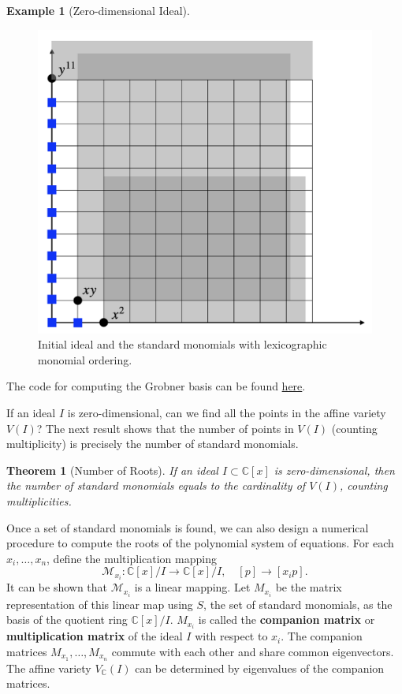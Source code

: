 \documentclass[
]{book}
\newtheorem{theorem}{Theorem}[chapter]
\theoremstyle{definition}
\theoremstyle{definition}
\newtheorem{example}{Example}[chapter]
\theoremstyle{definition}
\theoremstyle{definition}
\theoremstyle{remark}
\begin{document}
\begin{example}[Zero-dimensional Ideal]
\begin{figure}

{\centering \includegraphics[width=0.6\linewidth]{images/zero_dimensional_2} 

}

\caption{Initial ideal and the standard monomials with lexicographic monomial ordering.}\label{fig:ZeroDimensional2}
\end{figure}

The code for computing the Grobner basis can be found \href{https://github.com/ComputationalRobotics/Semidefinite-Examples/blob/main/zero_d_ideal.m}{here}.
\end{example}

If an ideal \(I\) is zero-dimensional, can we find all the points in the affine variety \(V(I)\)? The next result shows that the number of points in \(V(I)\) (counting multiplicity) is precisely the number of standard monomials.

\begin{theorem}[Number of Roots]
\protect\hypertarget{thm:PolySysRoots}{}\label{thm:PolySysRoots}If an ideal \(I \subset \mathbb{C}[x]\) is zero-dimensional, then the number of standard monomials equals to the cardinality of \(V(I)\), counting multiplicities.
\end{theorem}

Once a set of standard monomials is found, we can also design a numerical procedure to compute the roots of the polynomial system of equations. For each \(x_i,\dots,x_n\), define the multiplication mapping
\[
\mathcal{M}_{x_i}: \mathbb{C}[x]/I \rightarrow \mathbb{C}[x]/I, \quad [p] \rightarrow [x_i p].
\]
It can be shown that \(\mathcal{M}_{x_i}\) is a linear mapping. Let \(M_{x_i}\) be the matrix representation of this linear map using \(S\), the set of standard monomials, as the basis of the quotient ring \(\mathbb{C}[x]/I\). \(M_{x_i}\) is called the \textbf{companion matrix} or \textbf{multiplication matrix} of the ideal \(I\) with respect to \(x_i\). The companion matrices \(M_{x_1},\dots,M_{x_n}\) commute with each other and share common eigenvectors. The affine variety \(V_{\mathbb{C}}(I)\) can be determined by eigenvalues of the companion matrices.
\end{document}

